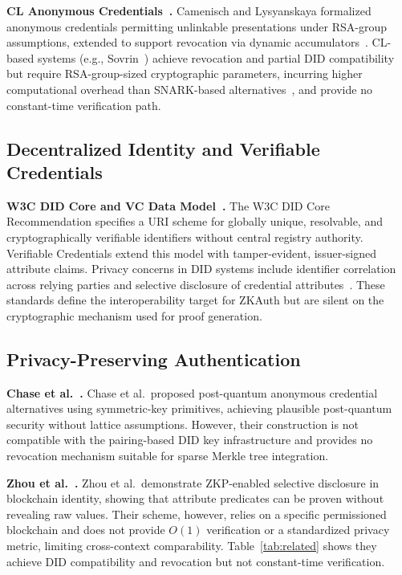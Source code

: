 \documentclass[journal,12pt,onecolumn]{IEEEtran}
\begin{document}
\textbf{CL Anonymous Credentials~\cite{camenisch2001efficient}.}
Camenisch and Lysyanskaya formalized anonymous credentials permitting
unlinkable presentations under RSA-group assumptions, extended to
support revocation via dynamic accumulators~\cite{camenisch2002dynamic}.
CL-based systems (e.g., Sovrin~\cite{miret2024sovrin}) achieve
revocation and partial DID compatibility but require RSA-group-sized
cryptographic parameters, incurring higher computational overhead than
SNARK-based alternatives~\cite{nakanishi2023efficient}, and provide no
constant-time verification path.

\subsection{Decentralized Identity and Verifiable Credentials}

\textbf{W3C DID Core and VC Data Model~\cite{did_core_2022,vc_data_model_2024}.}
The W3C DID Core Recommendation specifies a URI scheme for globally
unique, resolvable, and cryptographically verifiable identifiers without
central registry authority. Verifiable Credentials extend this model
with tamper-evident, issuer-signed attribute claims. Privacy concerns in
DID systems include identifier correlation across relying parties and
selective disclosure of credential attributes~\cite{liu2024ssi}. These
standards define the interoperability target for ZKAuth but are silent
on the cryptographic mechanism used for proof generation.

\subsection{Privacy-Preserving Authentication}

\textbf{Chase et al.~\cite{chase2017post}.}
Chase et al.\ proposed post-quantum anonymous credential alternatives
using symmetric-key primitives, achieving plausible post-quantum security
without lattice assumptions. However, their construction is not
compatible with the pairing-based DID key infrastructure and provides
no revocation mechanism suitable for sparse Merkle tree integration.

\textbf{Zhou et al.~\cite{zhou2023blockchain}.}
Zhou et al.\ demonstrate ZKP-enabled selective disclosure in blockchain
identity, showing that attribute predicates can be proven without
revealing raw values. Their scheme, however, relies on a specific
permissioned blockchain and does not provide $O(1)$ verification or a
standardized privacy metric, limiting cross-context comparability.
Table~\ref{tab:related} shows they achieve DID compatibility and
revocation but not constant-time verification.
\end{document}
